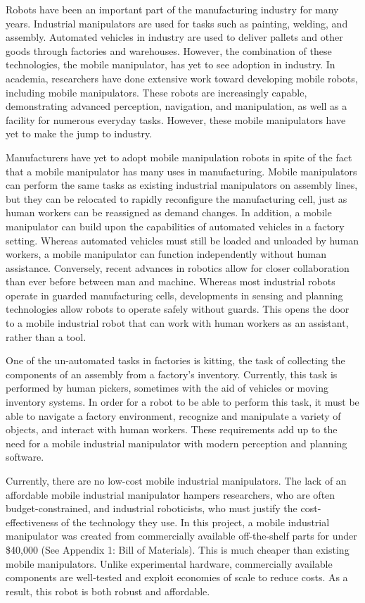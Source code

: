 \documentclass[]{cwru} %
\begin{document}
Robots have been an important part of the manufacturing industry for
many years. Industrial manipulators are used for tasks such as painting,
welding, and assembly. Automated vehicles in industry are used to
deliver pallets and other goods through factories and warehouses.
However, the combination of these technologies, the mobile manipulator,
has yet to see adoption in industry. In academia, researchers have done
extensive work toward developing mobile robots, including mobile
manipulators. These robots are increasingly capable, demonstrating
advanced perception, navigation, and manipulation, as well as a facility
for numerous everyday tasks. However, these mobile manipulators have yet
to make the jump to industry.

Manufacturers have yet to adopt mobile manipulation robots in spite of
the fact that a mobile manipulator has many uses in manufacturing.
Mobile manipulators can perform the same tasks as existing industrial
manipulators on assembly lines, but they can be relocated to rapidly
reconfigure the manufacturing cell, just as human workers can be
reassigned as demand changes. In addition, a mobile manipulator can
build upon the capabilities of automated vehicles in a factory setting.
Whereas automated vehicles must still be loaded and unloaded by human
workers, a mobile manipulator can function independently without human
assistance. Conversely, recent advances in robotics allow for closer
collaboration than ever before between man and machine. Whereas most
industrial robots operate in guarded manufacturing cells, developments
in sensing and planning technologies allow robots to operate safely
without guards. This opens the door to a mobile industrial robot that
can work with human workers as an assistant, rather than a tool.

One of the un-automated tasks in factories is kitting, the task of
collecting the components of an assembly from a factory's inventory.
Currently, this task is performed by human pickers, sometimes with the
aid of vehicles or moving inventory systems. In order for a robot to be
able to perform this task, it must be able to navigate a factory
environment, recognize and manipulate a variety of objects, and interact
with human workers. These requirements add up to the need for a mobile
industrial manipulator with modern perception and planning software.

Currently, there are no low-cost mobile industrial manipulators. The
lack of an affordable mobile industrial manipulator hampers researchers,
who are often budget-constrained, and industrial roboticists, who must
justify the cost-effectiveness of the technology they use. In this
project, a mobile industrial manipulator was created from commercially
available off-the-shelf parts for under \$40,000 (See Appendix 1: Bill
of Materials). This is much cheaper than existing mobile manipulators.
Unlike experimental hardware, commercially available components are
well-tested and exploit economies of scale to reduce costs. As a result,
this robot is both robust and affordable.
\end{document}
